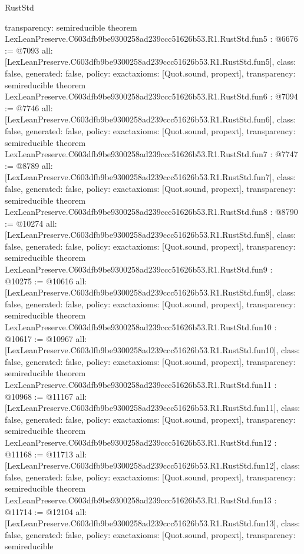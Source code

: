 \begin{lexlean}{RustStd}
\begin{coremodule}
{  transparency: semireducible
}
theorem LexLeanPreserve.C603dfb9be9300258ad239ccc51626b53.R1.RustStd.fun5 : @6676 := @7093 {
  all: [LexLeanPreserve.C603dfb9be9300258ad239ccc51626b53.R1.RustStd.fun5],
  class: false,
  generated: false,
  policy: exact{axioms: [Quot.sound, propext]},
  transparency: semireducible
}
theorem LexLeanPreserve.C603dfb9be9300258ad239ccc51626b53.R1.RustStd.fun6 : @7094 := @7746 {
  all: [LexLeanPreserve.C603dfb9be9300258ad239ccc51626b53.R1.RustStd.fun6],
  class: false,
  generated: false,
  policy: exact{axioms: [Quot.sound, propext]},
  transparency: semireducible
}
theorem LexLeanPreserve.C603dfb9be9300258ad239ccc51626b53.R1.RustStd.fun7 : @7747 := @8789 {
  all: [LexLeanPreserve.C603dfb9be9300258ad239ccc51626b53.R1.RustStd.fun7],
  class: false,
  generated: false,
  policy: exact{axioms: [Quot.sound, propext]},
  transparency: semireducible
}
theorem LexLeanPreserve.C603dfb9be9300258ad239ccc51626b53.R1.RustStd.fun8 : @8790 := @10274 {
  all: [LexLeanPreserve.C603dfb9be9300258ad239ccc51626b53.R1.RustStd.fun8],
  class: false,
  generated: false,
  policy: exact{axioms: [Quot.sound, propext]},
  transparency: semireducible
}
theorem LexLeanPreserve.C603dfb9be9300258ad239ccc51626b53.R1.RustStd.fun9 : @10275 := @10616 {
  all: [LexLeanPreserve.C603dfb9be9300258ad239ccc51626b53.R1.RustStd.fun9],
  class: false,
  generated: false,
  policy: exact{axioms: [Quot.sound, propext]},
  transparency: semireducible
}
theorem LexLeanPreserve.C603dfb9be9300258ad239ccc51626b53.R1.RustStd.fun10 : @10617 := @10967 {
  all: [LexLeanPreserve.C603dfb9be9300258ad239ccc51626b53.R1.RustStd.fun10],
  class: false,
  generated: false,
  policy: exact{axioms: [Quot.sound, propext]},
  transparency: semireducible
}
theorem LexLeanPreserve.C603dfb9be9300258ad239ccc51626b53.R1.RustStd.fun11 : @10968 := @11167 {
  all: [LexLeanPreserve.C603dfb9be9300258ad239ccc51626b53.R1.RustStd.fun11],
  class: false,
  generated: false,
  policy: exact{axioms: [Quot.sound, propext]},
  transparency: semireducible
}
theorem LexLeanPreserve.C603dfb9be9300258ad239ccc51626b53.R1.RustStd.fun12 : @11168 := @11713 {
  all: [LexLeanPreserve.C603dfb9be9300258ad239ccc51626b53.R1.RustStd.fun12],
  class: false,
  generated: false,
  policy: exact{axioms: [Quot.sound, propext]},
  transparency: semireducible
}
theorem LexLeanPreserve.C603dfb9be9300258ad239ccc51626b53.R1.RustStd.fun13 : @11714 := @12104 {
  all: [LexLeanPreserve.C603dfb9be9300258ad239ccc51626b53.R1.RustStd.fun13],
  class: false,
  generated: false,
  policy: exact{axioms: [Quot.sound, propext]},
  transparency: semireducible
}
\end{coremodule}
\end{lexlean}
